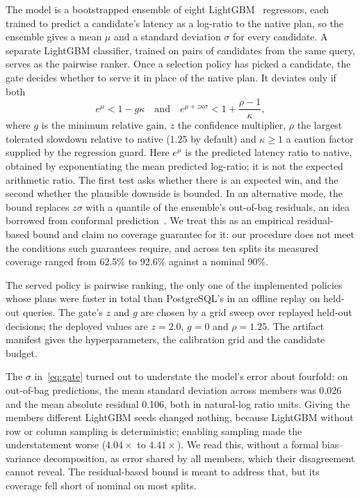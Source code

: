 \documentclass[conference]{IEEEtran}
\begin{document}
The model is a bootstrapped ensemble of eight LightGBM~\cite{lightgbm}
regressors, each trained to predict a candidate's latency as a log-ratio to the
native plan, so the ensemble gives a mean $\mu$ and a standard deviation
$\sigma$ for every candidate. A separate LightGBM classifier, trained on pairs
of candidates from the same query, serves as the pairwise ranker. Once a
selection policy has picked a candidate, the gate decides whether to serve it in
place of the native plan. It deviates only if both
\begin{equation}
e^{\mu} < 1 - g\kappa
\quad\text{and}\quad
e^{\mu + z\kappa\sigma} < 1 + \frac{\rho - 1}{\kappa},
\label{eq:gate}
\end{equation}
where $g$ is the minimum relative gain, $z$ the confidence multiplier, $\rho$
the largest tolerated slowdown relative to native (1.25 by default) and
$\kappa \ge 1$ a caution factor supplied by the regression guard. Here $e^{\mu}$
is the predicted latency ratio to native, obtained by exponentiating the mean
predicted log-ratio; it is not the expected arithmetic ratio. The first test
asks whether there is an expected win, and the second whether the plausible
downside is bounded. In an alternative mode, the bound replaces $z\sigma$ with
a quantile of the ensemble's out-of-bag residuals, an idea borrowed from
conformal prediction~\cite{vovk}. We treat this as an empirical residual-based
bound and claim no coverage guarantee for it: our procedure does not meet the
conditions such guarantees require, and across ten splits its measured coverage
ranged from 62.5\% to 92.6\% against a nominal 90\%.

The served policy is pairwise ranking, the only one of the implemented
policies whose plans were faster in total than PostgreSQL's in an offline
replay on held-out queries. The gate's $z$ and $g$ are chosen by a grid sweep
over replayed held-out decisions; the deployed values are $z = 2.0$, $g = 0$
and $\rho = 1.25$. The artifact manifest gives the hyperparameters, the
calibration grid and the candidate budget.

The $\sigma$ in~\eqref{eq:gate} turned out to understate the model's error
about fourfold: on out-of-bag predictions, the mean standard deviation across
members was 0.026 and the mean absolute residual 0.106, both in natural-log
ratio units. Giving the members different LightGBM seeds changed nothing, because
LightGBM without row or column sampling is deterministic; enabling sampling
made the understatement worse ($4.04\times$ to $4.41\times$). We read this,
without a formal bias--variance decomposition, as error shared by all members,
which their disagreement cannot reveal. The residual-based bound is meant to
address that, but its coverage fell short of nominal on most splits.
\end{document}
